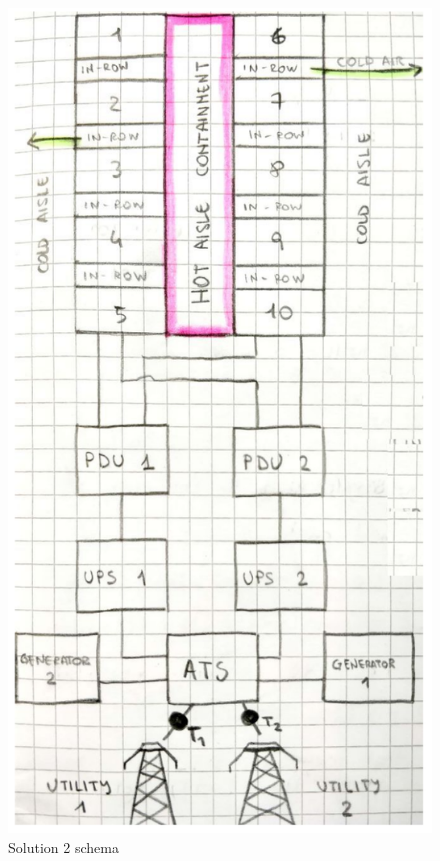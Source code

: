 \begin{paracol}{2}
  
  \begin{figure} [htbp]
    \centering
    \includegraphics{images/datacenter_sketch.png}
    \caption{Solution 2 schema}
    \label{fig:10racks}
  \end{figure}
\end{paracol}

